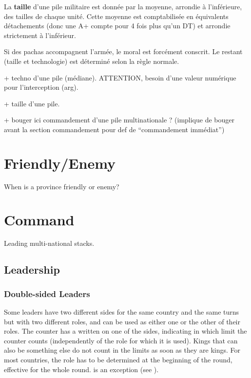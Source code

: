 \aparag[Size] La \textbf{taille} d'une pile militaire est donnée par la
moyenne, arrondie à l'inférieure, des tailles de chaque unité. Cette moyenne
est comptabilisée en équivalents détachements (donc une A+ compte pour 4 fois
plus qu'un DT) et arrondie strictement à l'inférieur.

\bparag[Exception:] Si des pachas accompagnent l'armée, le moral est forcément
conscrit. Le restant (taille et technologie) est déterminé selon la règle
normale.

\StackArtillery[\label{chMilitary:Stacks:Artillery}]

+ techno d'une pile (médiane). ATTENTION, besoin d'une valeur numérique pour
l'interception (arg).

+ taille d'une pile.

+ bouger ici commandement d'une pile multinationale ? (implique de bouger
avant la section commandement pour def de ``commandement immédiat'')

\section{Friendly/Enemy}
When is a province friendly or enemy?

\section{Command}
Leading multi-national stacks.

\subsection{Leadership}\label{chMilitary:Leadership}
\subsubsection{Double-sided Leaders}\label{chMilitary:Double Sided Leaders}
\aparag Some leaders have two different sides for the same country and the
same turns but with two different roles, and can be used as either one or the
other of their roles.
\bparag The counter has a {\textetoile} written on one of the sides,
indicating in which limit the counter counts (independently of the role
for which it is used).
\bparag Kings that can also be something else do not count in the limits
as soon as they are kings.
\bparag For most countries, the role has to be determined at the
beginning of the round, effective for the whole round. \POR is an
exception (see ).

